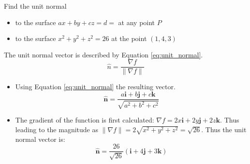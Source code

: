 Find the unit normal
\begin{itemize}
	\item to the surface $ax+by+cz=d=$ at any point $P$
	\item to the surface $x^2+y^2+z^2=26$ at the point $\left(1,4,3\right)$
\end{itemize}

The unit normal vector is described by Equation \ref{eq:unit_normal}.
\begin{equation}
	\hat{n}=\frac{\nabla f}{\|\nabla f\|}
	\label{eq:unit_normal}
\end{equation}

\begin{itemize}
	\item Using Equation \ref{eq:unit_normal} the resulting vector.
	\begin{equation*}
	\boxed{
		\hat{\boldsymbol{n}}=\frac{a\boldsymbol{i}+b\boldsymbol{j}+c\boldsymbol{k}}{\sqrt{a^2+b^2+c^2}}}
	\end{equation*}
	\item The gradient of the function is first calculated: $\nabla f=2x\boldsymbol{i}+2y\boldsymbol{j}+2z\boldsymbol{k}$. Thus leading to the magnitude as $\|\nabla f\|=2\sqrt{x^2+y^2+z^2}=\sqrt{26}$. Thus the unit normal vector is:
\begin{equation*}
	\boxed{
		\hat{\boldsymbol{n}}=\frac{26}{\sqrt{26}}\left(\boldsymbol{i}+4\boldsymbol{j}+3\boldsymbol{k}\right)
		}
\end{equation*}

\end{itemize}